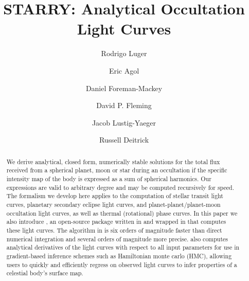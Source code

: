 \documentclass[modern]{aastex61}
\begin{document}

\setlength{\abovedisplayskip}{1.5em}
\setlength{\belowdisplayskip}{1.5em}

\title{%
    \textbf{STARRY}: Analytical Occultation Light Curves
}

\author[0000-0002-0296-3826]{Rodrigo Luger}
%
\author{Eric Agol}
%
\author{Daniel Foreman-Mackey}
%
\author{David P. Fleming}
%
\author{Jacob Lustig-Yaeger}
%
\author{Russell Deitrick}


\begin{abstract}
We derive analytical, closed form, numerically stable solutions for the total flux
received from a spherical planet, moon or star during an occultation
if the specific intensity map of the body is expressed as a
sum of spherical harmonics. Our expressions are valid to arbitrary degree
and may be computed recursively for speed. The formalism we develop
here applies to the computation of stellar transit light curves,
planetary secondary eclipse light curves, and planet-planet/planet-moon
occultation light curves, as well as thermal (rotational) phase curves.
In this paper we also introduce \starry, an open-source package written in \cpp
and wrapped in \Python that computes these light curves.
The algorithm in \starry is six orders of magnitude faster than direct
numerical integration and several orders of magnitude more precise.
\starry also computes analytical derivatives of the light curves with respect to all input
parameters for use in gradient-based inference schemes such as
Hamiltonian monte carlo (HMC), allowing users to quickly and efficiently
regress on observed light curves to infer properties of a celestial body's
surface map.
\end{abstract}
\end{document}
